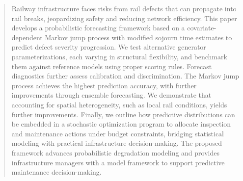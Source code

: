 
\begin{abstract}
Railway infrastructure faces risks from rail defects that can propagate into rail breaks, jeopardizing safety and reducing network efficiency. This paper develops a probabilistic forecasting framework based on a covariate-dependent Markov jump process with modified sojourn time estimates to predict defect severity progression. We test alternative generator parameterizations, each varying in structural flexibility, and benchmark them against reference models using proper scoring rules. Forecast diagnostics further assess calibration and discrimination. The Markov jump process achieves the highest prediction accuracy, with further improvements through ensemble forecasting. We demonstrate that accounting for spatial heterogeneity, such as local rail conditions, yields further improvements. Finally, we outline how predictive distributions can be embedded in a stochastic optimization program to allocate inspection and maintenance actions under budget constraints, bridging statistical modeling with practical infrastructure decision-making. The proposed framework advances probabilistic degradation modeling and provides infrastructure managers with a model framework to support predictive maintenance decision-making.
\end{abstract}
